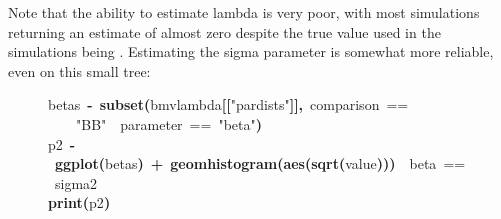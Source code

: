 \documentclass{elsarticle}
\makeatletter
\newcommand{\hlfunctioncall}[1]{\textcolor[rgb]{.5,0,.33}{\textbf{#1}}}%
\newcommand{\hlstring}[1]{\textcolor[rgb]{.6,.6,1}{#1}}%
\newcommand{\hlkeyword}[1]{\textbf{#1}}%
\newcommand{\hlcomment}[1]{\textcolor[rgb]{.18,.6,.34}{#1}}%
\newcommand{\hlassignement}[1]{\textbf{#1}}%
\newcommand{\hlsymbol}[1]{#1}%
\newcommand{\hlstd}[1]{\textcolor[rgb]{0,0,0}{#1}}%
\newenvironment{kframe}{%
 \def\FrameCommand##1{\hskip\@totalleftmargin \hskip-\fboxsep
 \colorbox{shadecolor}{##1}\hskip-\fboxsep
     \hskip-\linewidth \hskip-\@totalleftmargin \hskip\columnwidth}%
 \MakeFramed {\advance\hsize-\width
   \@totalleftmargin\z@ \linewidth\hsize
   \@setminipage}}%
 {\par\unskip\endMakeFramed}
\newenvironment{knitrout}{}{} %
\makeatother
\begin{document}
Note that the ability to estimate lambda is very poor, with most simulations returning an estimate of almost zero despite the true value used in the simulations being .  Estimating the sigma parameter is somewhat more reliable, even on this small tree:

\begin{figure}
\begin{center}
\begin{knitrout}
\color{fgcolor}\begin{kframe}
\begin{flushleft}
\ttfamily\noindent
\hlsymbol{betas}{\ }\hlassignement{\usebox{\hlnormalsizeboxlessthan}-}{\ }\hlfunctioncall{subset}\hlkeyword{(}\hlsymbol{bm\usebox{\hlnormalsizeboxunderscore}v\usebox{\hlnormalsizeboxunderscore}lambda}\hlkeyword{[[}\hlstring{"{}par\usebox{\hlnormalsizeboxunderscore}dists"{}}\hlkeyword{]}\hlkeyword{]}\hlkeyword{,}{\ }\hlsymbol{comparison}{\ }==\hspace*{\fill}\\
\hlstd{}{\ }{\ }{\ }{\ }\hlstring{"{}BB"{}}{\ }\hlkeyword{\usebox{\hlnormalsizeboxand}}{\ }\hlsymbol{parameter}{\ }=={\ }\hlstring{"{}beta"{}}\hlkeyword{)}\hspace*{\fill}\\
\hlstd{}\hlsymbol{p2}{\ }\hlassignement{\usebox{\hlnormalsizeboxlessthan}-}{\ }\hlfunctioncall{ggplot}\hlkeyword{(}\hlsymbol{betas}\hlkeyword{)}{\ }\hlkeyword{+}{\ }\hlfunctioncall{geom\usebox{\hlnormalsizeboxunderscore}histogram}\hlkeyword{(}\hlfunctioncall{aes}\hlkeyword{(}\hlfunctioncall{sqrt}\hlkeyword{(}\hlsymbol{value}\hlkeyword{)}\hlkeyword{)}\hlkeyword{)}{\ }{\ }\hlcomment{\usebox{\hlnormalsizeboxhash}{\ }beta{\ }=={\ }sigma\usebox{\hlnormalsizeboxhat}2}\hspace*{\fill}\\
\hlstd{}\hlfunctioncall{print}\hlkeyword{(}\hlsymbol{p2}\hlkeyword{)}\mbox{}
\normalfont
\end{flushleft}



\end{kframe}
\end{knitrout}
\end{center}
\end{figure}
\end{document}
